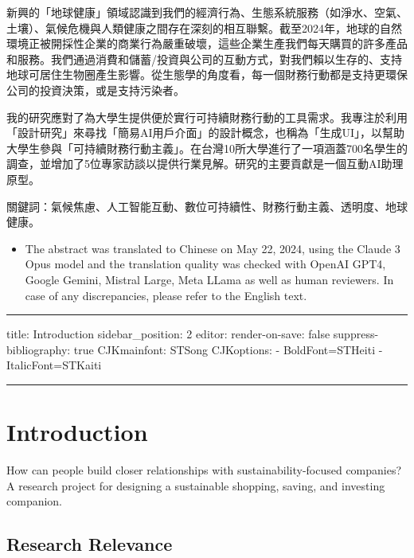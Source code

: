 \documentclass[
  letterpaper,
  DIV=11,
  numbers=noendperiod]{scrartcl}
\providecommand{\tightlist}{%
  \setlength{\itemsep}{0pt}\setlength{\parskip}{0pt}}\usepackage{longtable,booktabs,array}
\begin{document}
新興的「地球健康」領域認識到我們的經濟行為、生態系統服務（如淨水、空氣、土壤）、氣候危機與人類健康之間存在深刻的相互聯繫。截至2024年，地球的自然環境正被開採性企業的商業行為嚴重破壞，這些企業生產我們每天購買的許多產品和服務。我們通過消費和儲蓄/投資與公司的互動方式，對我們賴以生存的、支持地球可居住生物圈產生影響。從生態學的角度看，每一個財務行動都是支持更環保公司的投資決策，或是支持污染者。

我的研究應對了為大學生提供便於實行可持續財務行動的工具需求。我專注於利用「設計研究」來尋找「簡易AI用戶介面」的設計概念，也稱為「生成UI」，以幫助大學生參與「可持續財務行動主義」。在台灣10所大學進行了一項涵蓋700名學生的調查，並增加了5位專家訪談以提供行業見解。研究的主要貢獻是一個互動AI助理原型。

關鍵詞：氣候焦慮、人工智能互動、數位可持續性、財務行動主義、透明度、地球健康。

\begin{itemize}
\tightlist
\item
  The abstract was translated to Chinese on May 22, 2024, using the
  Claude 3 Opus model and the translation quality was checked with
  OpenAI GPT4, Google Gemini, Mistral Large, Meta LLama as well as human
  reviewers. In case of any discrepancies, please refer to the English
  text.
\end{itemize}

\newpage

\begin{center}\rule{0.5\linewidth}{0.5pt}\end{center}

title: Introduction sidebar\_position: 2 editor: render-on-save: false
suppress-bibliography: true CJKmainfont: STSong CJKoptions: -
BoldFont=STHeiti - ItalicFont=STKaiti

\begin{center}\rule{0.5\linewidth}{0.5pt}\end{center}

\section{Introduction}\label{introduction}

How can people build closer relationships with sustainability-focused
companies? A research project for designing a sustainable shopping,
saving, and investing companion.

\subsection{Research Relevance}\label{research-relevance}
\end{document}

